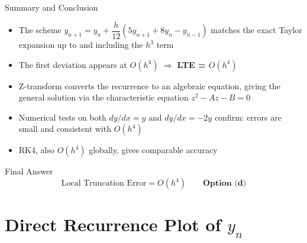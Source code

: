 \documentclass{beamer}
\begin{document}
\begin{frame}{Summary and Conclusion}

\begin{itemize}
    \item The scheme $y_{n+1} = y_n + \dfrac{h}{12}(5y_{n+1} + 8y_n - y_{n-1})$ matches the exact Taylor expansion up to and including the $h^3$ term

    \vspace{0.2cm}
    \item The first deviation appears at $O(h^4)$ $\Rightarrow$ \textbf{LTE = $O(h^4)$}

    \vspace{0.2cm}
    \item Z-transform converts the recurrence to an algebraic equation, giving the general solution via the characteristic equation $z^2 - Az - B = 0$

    \vspace{0.2cm}
    \item Numerical tests on both $dy/dx = y$ and $dy/dx = -2y$ confirm: errors are small and consistent with $O(h^4)$

    \vspace{0.2cm}
    \item RK4, also $O(h^4)$ globally, gives comparable accuracy
\end{itemize}

\vspace{0.3cm}
\begin{alertblock}{Final Answer}
\[
    \boxed{\text{Local Truncation Error} = O(h^4)}
    \qquad \textbf{Option (d)}
\]
\end{alertblock}

\end{frame}

\section{Direct Recurrence Plot of $y_n$}
\end{document}
